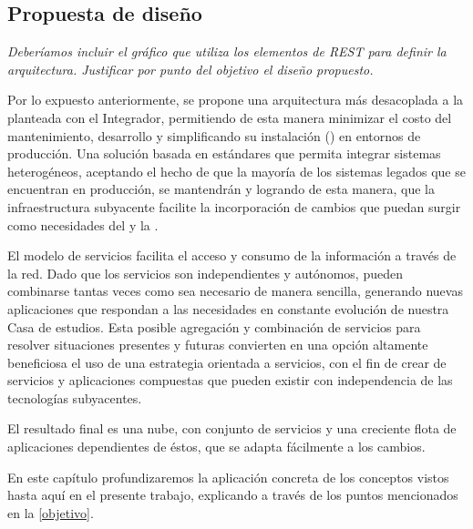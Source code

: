 \subsection{Propuesta de diseño}
\label{propuesta}

\textit{Deberíamos incluir el gráfico que utiliza los elementos de REST para definir la arquitectura. Justificar por punto del objetivo el diseño propuesto.}



Por lo expuesto anteriormente, se propone una arquitectura más desacoplada a la planteada con el Integrador, permitiendo de esta manera minimizar el costo del mantenimiento, desarrollo y simplificando su instalación () en entornos de producción. Una solución basada en estándares que permita integrar sistemas heterogéneos, aceptando el hecho de que la mayoría de los sistemas legados que se encuentran en producción, se mantendrán y logrando de esta manera, que la infraestructura subyacente facilite la incorporación de cambios que puedan surgir como necesidades del \cespi y la \unlp.

El modelo de servicios facilita el acceso y consumo de la información a través de la red. Dado que los servicios son independientes y autónomos, pueden combinarse tantas veces como sea necesario de manera sencilla, generando nuevas aplicaciones que respondan a las necesidades en constante evolución de nuestra Casa de estudios. Esta posible agregación y combinación de servicios para resolver situaciones presentes y futuras convierten en una opción altamente beneficiosa el uso de una estrategia orientada a servicios, con el fin de crear de servicios y aplicaciones compuestas que pueden existir con independencia de las tecnologías subyacentes\cite{microsoft2006}.

El resultado final es una nube, con conjunto de servicios y una creciente flota de aplicaciones dependientes de éstos, que se adapta fácilmente a los cambios.

En este capítulo profundizaremos la aplicación concreta de los conceptos vistos hasta aquí en el presente trabajo, explicando a través de los puntos mencionados en la \autoref{objetivo}.


